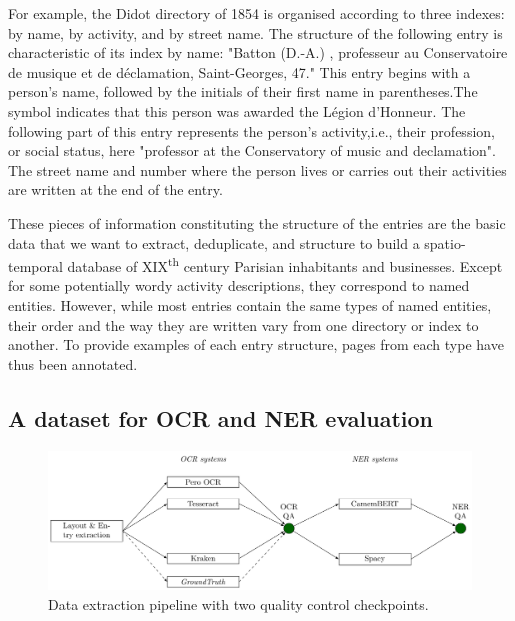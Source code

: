 For example, the Didot directory of 1854 is organised according to three indexes: by name, by activity, and by street name. The structure of the following entry is characteristic of its index by name: "Batton (D.-A.) , professeur au Conservatoire de musique et de déclamation, Saint-Georges, 47." This entry begins with a person's name, followed by the initials of their first name in parentheses.The symbol indicates that this person was awarded the Légion d'Honneur. The following part of this entry represents the person's activity,i.e., their profession, or social status, here "professor at the Conservatory of music and declamation". The street name and number where the person lives or carries out their activities are written at the end of the entry.

These pieces of information constituting the structure of the entries are the basic data that we want to extract, deduplicate, and structure to build a spatio-temporal database of XIX\textsuperscript{th} century Parisian inhabitants and businesses. Except for some potentially wordy activity descriptions, they correspond to named entities. However, while most entries contain the same types of named entities, their order and the way they are written vary from one directory or index to another. To provide examples of each entry structure, pages from each type have thus been annotated. %


\subsection{A dataset for OCR and NER evaluation}


\begin{figure}[tb]
    \includegraphics[width=\linewidth]{figs/protocol.pdf}
    \caption{Data extraction pipeline with two quality control checkpoints. }
    \label{fig.pipeline}
\end{figure}


